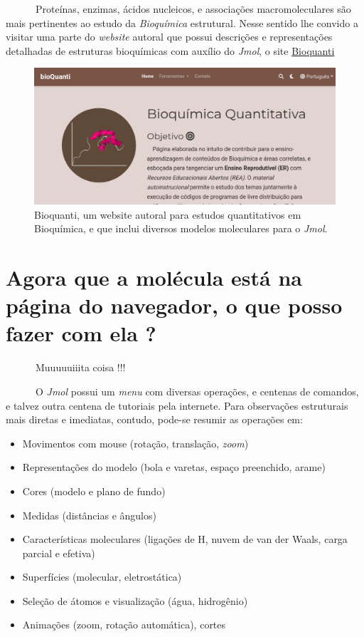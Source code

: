 \documentclass[
  letterpaper,
  DIV=11,
  numbers=noendperiod]{scrreprt}
\providecommand{\tightlist}{%
  \setlength{\itemsep}{0pt}\setlength{\parskip}{0pt}}\usepackage{longtable,booktabs,array}
\begin{document}
~~~~~~Proteínas, enzimas, ácidos nucleicos, e associações
macromoleculares são mais pertinentes ao estudo da \emph{Bioquímica}
estrutural. Nesse sentido lhe convido a visitar uma parte do
\emph{website} autoral que possui descrições e representações detalhadas
de estruturas bioquímicas com auxílio do \emph{Jmol}, o site
\href{https://bioquanti.netlify.app/}{Bioquanti}

\begin{figure}[H]

{\centering \includegraphics{bioquanti.png}

}

\caption{Bioquanti, um website autoral para estudos quantitativos em
Bioquímica, e que inclui diversos modelos moleculares para o
\emph{Jmol}.}

\end{figure}%

\section{Agora que a molécula está na página do navegador, o que posso
fazer com ela
?}\label{agora-que-a-moluxe9cula-estuxe1-na-puxe1gina-do-navegador-o-que-posso-fazer-com-ela}

~~~~~~Muuuuuiiita coisa !!!

~~~~~~O \emph{Jmol} possui um \emph{menu} com diversas operações, e
centenas de comandos, e talvez outra centena de tutoriais pela
internete. Para observações estruturais mais diretas e imediatas,
contudo, pode-se resumir as operações em:

\begin{itemize}
\tightlist
\item
  Movimentos com mouse (rotação, translação, \emph{zoom})
\item
  Representações do modelo (bola e varetas, espaço preenchido, arame)
\item
  Cores (modelo e plano de fundo)
\item
  Medidas (distâncias e ângulos)
\item
  Características moleculares (ligações de H, nuvem de van der Waals,
  carga parcial e efetiva)
\item
  Superfícies (molecular, eletrostática)
\item
  Seleção de átomos e visualização (água, hidrogênio)
\item
  Animações (zoom, rotação automática), cortes
\end{itemize}
\end{document}
